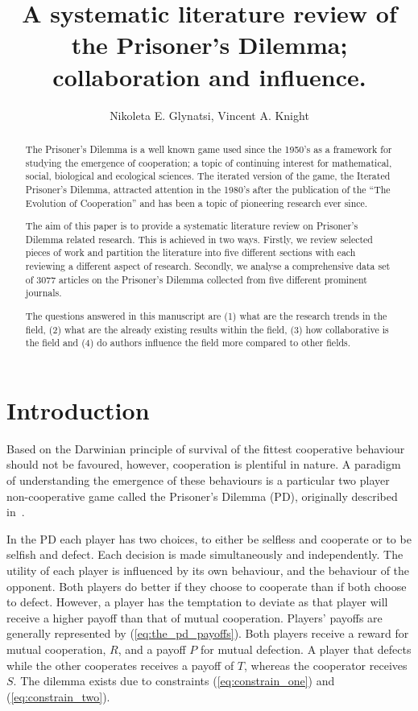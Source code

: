 \documentclass{article}
\title{A systematic literature review of the Prisoner's Dilemma; collaboration and influence.}
\author{Nikoleta E. Glynatsi, Vincent A. Knight}
\date{}
\theoremstyle{definition}
\begin{document}
\maketitle

\begin{abstract}
    The Prisoner's Dilemma is a well known game used since the 1950's as a
    framework for studying the emergence of cooperation; a topic of continuing
    interest for mathematical, social, biological and ecological sciences. The
    iterated version of the game, the Iterated Prisoner's Dilemma, attracted
    attention in the 1980's after the publication of the ``The Evolution of
    Cooperation'' and has been a topic of pioneering research ever since.

    The aim of this paper is to provide a systematic literature review on
    Prisoner's Dilemma related research. This is achieved in two ways.
    Firstly, we review selected pieces of work and partition the literature
    into five different sections with each reviewing a different
    aspect of research. Secondly, we
    analyse a comprehensive data set of 3077 articles on the
    Prisoner's Dilemma collected from five different prominent journals.

    The questions answered in this manuscript are (1) what are the research trends
    in the field, (2) what are the already existing results within the field,
    (3) how collaborative is the field and (4) do authors influence the field more
    compared to other fields.
\end{abstract}

\section{Introduction}\label{section:introduction}

Based on the Darwinian principle of survival of the fittest cooperative behaviour
should not be favoured, however, cooperation is plentiful in nature.
A paradigm of understanding the emergence of these behaviours is
a particular two player non-cooperative game called the Prisoner's Dilemma (PD),
originally described in~\cite{Flood1958}.

In the PD each player has two choices, to either be selfless and cooperate or to
be selfish and defect. Each decision is made simultaneously and
independently. The utility of each player is influenced by its own behaviour,
and the behaviour of the opponent. Both players do better if they choose to
cooperate than if both choose to defect. However, a player has the temptation to
deviate as that player will receive a higher payoff than that of mutual
cooperation.
Players' payoffs are generally represented by (\ref{eq:the_pd_payoffs}). Both
players receive a reward for mutual cooperation, \(R\), and a payoff \(P\) for
mutual defection. A player that defects while the other cooperates receives a payoff of
\(T\), whereas the cooperator receives \(S\). The dilemma exists due
to constraints (\ref{eq:constrain_one}) and (\ref{eq:constrain_two}).
\end{document}
